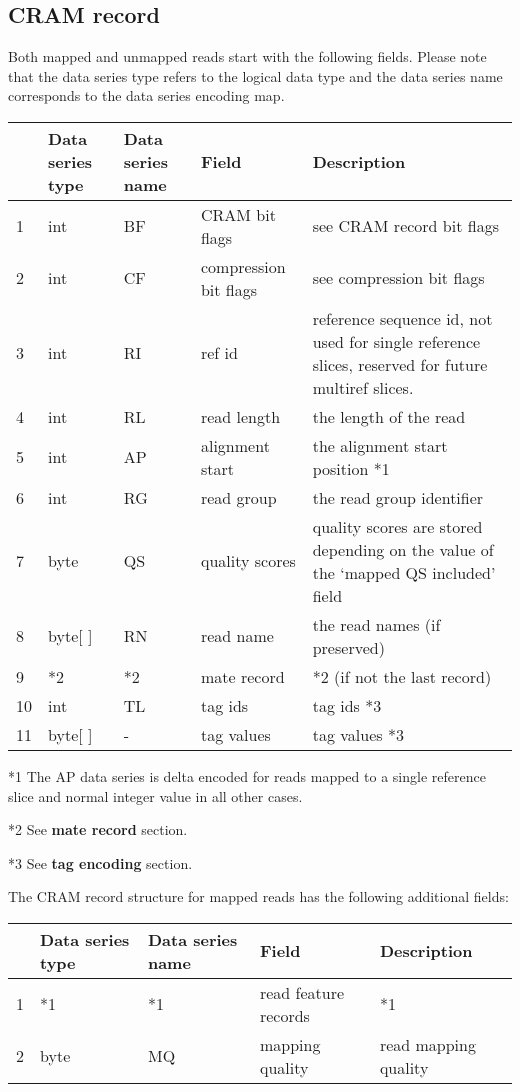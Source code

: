 \documentclass[a4paper]{article}
\begin{document}
\subsection{\textbf{CRAM record}}

Both mapped and unmapped reads start with the following fields. Please note that 
the data series type refers to the logical data type and the data series name corresponds 
to the data series encoding map.

\begin{tabular}{|>{\raggedright}p{36pt}|>{\raggedright}p{70pt}|>{\raggedright}p{75pt}|>{\raggedright}p{90pt}|>{\raggedright}p{171pt}|}
\hline
 & \textbf{Data series type} & \textbf{Data series name} & \textbf{Field} & \textbf{Description}\tabularnewline
\hline
1 & int & BF & CRAM bit flags & see CRAM record bit flags\tabularnewline
\hline
2 & int & CF  & compression bit flags & see compression bit flags\tabularnewline
\hline
3 & int & RI & ref id & reference sequence id, not used for single reference slices, 
reserved for future multiref slices. \tabularnewline
\hline
4 & int & RL & read length & the length of the read\tabularnewline
\hline
5 & int & AP & alignment start & the alignment start position *1\tabularnewline
\hline
6 & int & RG & read group & the read group identifier\tabularnewline
\hline
7 & byte & QS & quality scores & quality scores are stored depending on the value 
of the `mapped QS included' field\tabularnewline
\hline
8 & byte[ ] & RN & read name & the read names (if preserved)\tabularnewline
\hline
9 & *2 & *2 & mate record & *2 (if not the last record)\tabularnewline
\hline
10 & int & TL & tag ids & tag ids *3\tabularnewline
\hline
11 & byte[ ] & - & tag values & tag values *3\tabularnewline
\hline
\end{tabular}

*1 The AP data series is delta encoded for reads mapped to a single reference slice 
and normal integer value in all other cases. 

*2 See \textbf{mate record} section.

*3 See \textbf{tag encoding} section.

The CRAM record structure for mapped reads has the following additional fields:

\begin{tabular}{|>{\raggedright}p{36pt}|>{\raggedright}p{70pt}|>{\raggedright}p{74pt}|>{\raggedright}p{85pt}|>{\raggedright}p{177pt}|}
\hline
 & \textbf{Data series type} & \textbf{Data series name} & \textbf{Field} & \textbf{Description}\tabularnewline
\hline
1 & *1 & *1 & read feature records & *1\tabularnewline
\hline
2 & byte & MQ & mapping quality & read mapping quality\tabularnewline
\hline
\end{tabular}
\end{document}
